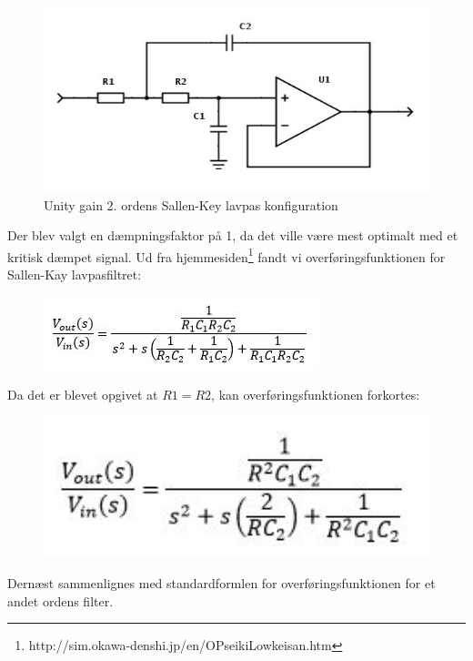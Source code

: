 \begin{figure}[H]
	\centering
	\includegraphics[width=1\textwidth]{Figurer/FilterDesign}
	\caption{Unity gain 2. ordens Sallen-Key lavpas konfiguration}
	\label{fig:Filter}
\end{figure}

Der blev valgt en dæmpningsfaktor på 1, da det ville være mest optimalt med et kritisk dæmpet signal. Ud fra hjemmesiden\footnote{http://sim.okawa-denshi.jp/en/OPseikiLowkeisan.htm} fandt vi overføringsfunktionen for Sallen-Kay lavpasfiltret:

\begin{figure}[H]
	\centering
	\includegraphics{Figurer/ligning1}
	\label{fig:lign1}
\end{figure}

Da det er blevet opgivet at $R1=R2$, kan overføringsfunktionen forkortes: 

\begin{figure}[H]
	\centering
	\includegraphics[width=1\textwidth]{Figurer/ligning2}
\end{figure}

Dernæst sammenlignes med standardformlen for overføringsfunktionen for et andet ordens filter.

